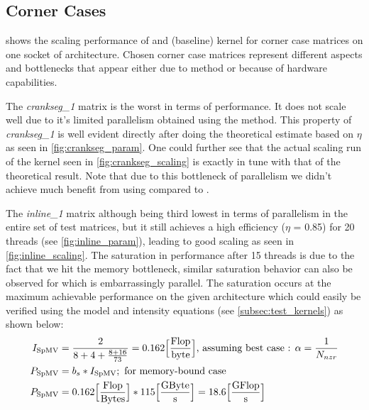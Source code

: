 \subsection{Corner Cases}



 shows the scaling performance of \SymmSpmv and \SpMV (baseline) kernel for corner case matrices on one socket of \SKX architecture. Chosen corner case matrices represent different aspects and bottlenecks that appear either due to \RACE method or because of hardware capabilities.

 The \emph{crankseg\_1} matrix is the worst in terms of performance. It does not scale well due to it's limited parallelism obtained using the \RACE method. This property of \emph{crankseg\_1} is well evident directly after doing the theoretical estimate based on $\eta$ as  seen in \cref{fig:crankseg_param}. One could further see that the actual scaling run of the kernel seen in \cref{fig:crankseg_scaling} is exactly in tune with that of the theoretical result. Note that due to this bottleneck of parallelism we didn't achieve much benefit from using \SymmSpmv compared to \SpMV.

The \emph{inline\_1} matrix although being third lowest in terms of parallelism in the entire set of test matrices, but it still achieves a high efficiency ($\eta$ = 0.85) for 20 threads (see \cref{fig:inline_param}), leading to good scaling as seen in \cref{fig:inline_scaling}. The saturation in performance after 15 threads is due to the fact that we hit the memory bottleneck, similar saturation behavior can also be observed for \SpMV which is embarrassingly parallel. The saturation occurs at the maximum achievable performance on the given architecture which could easily be verified using the \roofline model \cite{Williams_roofline} and intensity equations (see \cref{subsec:test_kernels}) as shown below:
\begin{align*}
	 I_\mathrm{SpMV} &= \frac{2}{8+4+\frac{8+16}{73}} = 0.162 \Big[\frac{\mbox{Flop}}{\mbox{byte}}\Big] \text{, assuming best case : $\alpha = \frac{1}{N_{nzr}}$}\\
	 P_\mathrm{SpMV} &= b_s*I_\mathrm{SpMV}; \text{  for memory-bound case}\\
	 P_\mathrm{SpMV} &= 0.162\Big[\frac{\mbox{Flop}}{\mbox{Bytes}}\Big]*115\Big[\frac{\mbox{GByte}}{\mbox{s}}\Big] = 18.6 \Big[\frac{\mbox{GFlop}}{\mbox{s}}\Big]\\
\end{align*}


